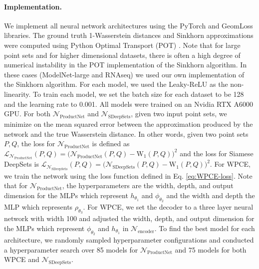 \documentclass[12pt]{article}
\newcommand{\Network}{\mathcal{N}_{\mathrm{ProductNet}}}
\begin{document}
\paragraph{Implementation.} We implement all neural network architectures using the PyTorch\citep{paszke2019pytorch} and GeomLoss \citep{feydy2019interpolating} libraries. The ground truth 1-Wasserstein distances and Sinkhorn approximations were computed using Python Optimal Transport (POT) \citep{flamary2021pot}. Note that for large point sets and for higher dimensional datasets, there is often a high degree of numerical instability in the POT implementation of the Sinkhorn algorithm. In these cases (ModelNet-large and RNAseq) we used our own implementation of the Sinkhorn algorithm. For each model, we used the Leaky-ReLU as the non-linearity. To train each model, we set the batch size for each dataset to be 128 and the learning rate to 0.001. All models were trained on an Nvidia RTX A6000 GPU. For both $\Network$ and $\mathcal{N}_{\mathrm{SDeepSets}}$, given two input point sets, we minimize on the mean squared error between the approximation produced by the network and the true Wasserstein distance. In other words, given two point sets $P, Q$, the loss for $\Network$ is defined as $\mathcal{L}_{\Network}(P, Q) = \Big(\Network(P, Q) - \mathrm{W}_1(P, Q)\Big)^2$ and the loss for Siamese DeepSets is $\mathcal{L}_{\mathcal{N}_{\mathrm{SDeepSets}}}(P, Q) = \Big(\mathcal{N}_{\mathrm{SDeepSets}}(P, Q) - \mathrm{W}_1(P, Q) \Big)^2$.
For WPCE, we train the network using the loss function defined in Eq. \ref{eq:WPCE-loss}. Note that for $\Network$, the hyperparameters are the width, depth, and output dimension for the MLPs which represent  $h_{\theta_1}$ and $\phi_{\theta_2}$ and the width and depth the MLP which represents $\rho_{\theta_3}$. For WPCE, we set the decoder to a three layer neural network with width 100 and adjusted the width, depth, and output dimension for the MLPs which represent $\phi_{\theta_2}$ and $h_{\theta_1}$ in $\mathcal{N}_{\mathrm{encoder}}$. To find the best model for each architecture, we randomly sampled hyperparameter configurations and conducted a hyperparameter search over 85 models for $\Network$ and 75 models for both WPCE and $\mathcal{N}_{\mathrm{SDeepSets}}$.
\end{document}
